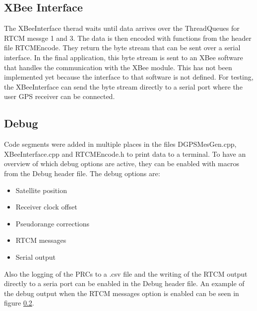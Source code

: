 \subsection{XBee Interface}

The XBeeInterface therad waits until data arrives over the ThreadQueues for RTCM messge 1 and 3.
The data is then encoded with functions from the header file RTCMEncode.
They return the byte stream that can be sent over a serial interface.
In the final application, this byte stream is sent to an XBee software that handles the communication with the XBee module.
This has not been implemented yet because the interface to that software is not defined.
For testing, the XBeeInterface can send the byte stream directly to a serial port where the user GPS receiver can be connected.

\subsection{Debug}

Code segments were added in multiple places in the files DGPSMesGen.cpp, XBeeInterface.cpp and RTCMEncode.h to print data to a terminal.
To have an overview of which debug options are active, they can be enabled with macros from the Debug header file.
The debug options are:
\begin{itemize}
 \setlength\itemsep{0.1cm}
 \item Satellite position
 \item Receiver clock offset
 \item Pseudorange corrections
 \item RTCM messages
 \item Serial output
\end{itemize}
Also the logging of the PRCs to a .csv file and the writing of the RTCM output directly to a seria port can be enabled in the Debug header file.
An example of the debug output when the RTCM messages option is enabled can be seen in figure \ref{}.